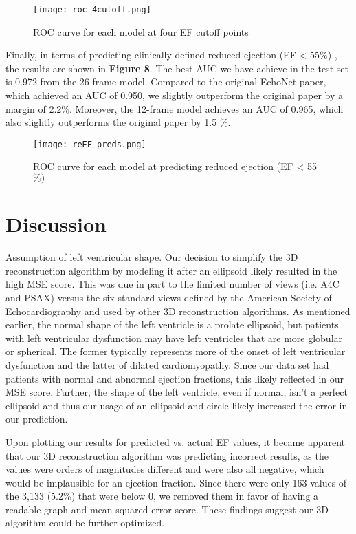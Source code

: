 \documentclass{article}
\begin{document}
\begin{figure} [H]
  \centering
\texttt{[image: roc\_4cutoff.png]}
  \caption{ROC curve for each model at four EF cutoff points}
\end{figure}

Finally, in terms of predicting clinically defined reduced ejection (EF < 55$\%$) \cite{hf}, the results are shown in \textbf{Figure 8}. The best AUC we have achieve in the test set is 0.972 from the 26-frame model. Compared to the original EchoNet paper, which achieved an AUC of 0.950, we slightly outperform the original paper by a margin of 2.2$\%$. Moreover, the 12-frame model achieves an AUC of 0.965, which also slightly outperforms the original paper by 1.5 $\%$. 

\begin{figure} [H]
  \centering
\texttt{[image: reEF\_preds.png]}
  \caption{ROC curve for each model at predicting reduced ejection (EF < 55$\%)$}
\end{figure}

\section{Discussion}\label{sec4}

Assumption of left ventricular shape. Our decision to simplify the 3D reconstruction algorithm by modeling it after an ellipsoid likely resulted in the high MSE score. This was due in part to the limited number of views (i.e. A4C and PSAX) versus the six standard views defined by the American Society of Echocardiography\cite{echoguidelines} and used by other 3D reconstruction algorithms\cite{pix2voxx,echoautosegcnn}. As mentioned earlier, the normal shape of the left ventricle is a prolate ellipsoid\cite{lvshape,rajan2016}, but patients with left ventricular dysfunction may have left ventricles that are more globular or spherical. The former typically represents more of the onset of left ventricular dysfunction and the latter of dilated cardiomyopathy\cite{rajan2016}. Since our data set had patients with normal and abnormal ejection fractions, this likely reflected in our MSE score. Further, the shape of the left ventricle, even if normal, isn't a perfect ellipsoid and thus our usage of an ellipsoid and circle likely increased the error in our prediction. 

 Upon plotting our results for predicted vs. actual EF values, it became apparent that our 3D reconstruction algorithm was predicting incorrect results, as the values were orders of magnitudes different and were also all negative, which would be implausible for an ejection fraction. Since there were only 163 values of the 3,133 (5.2\%) that were below 0, we removed them in favor of having a readable graph and mean squared error score. These findings suggest our 3D algorithm could be further optimized. 
\end{document}
